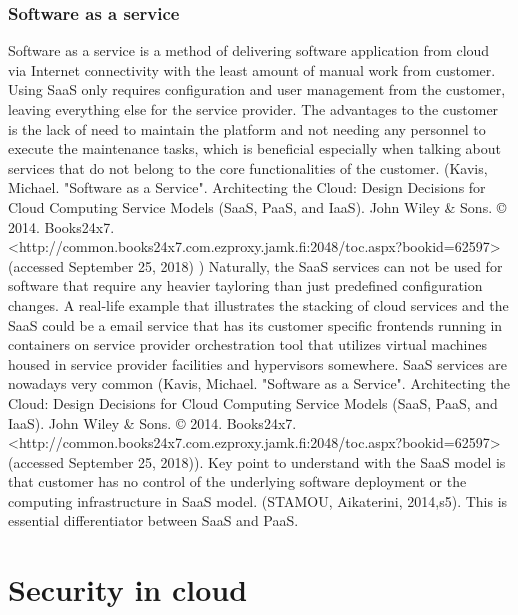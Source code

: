 \documentclass{article}
\begin{document}
\subsubsection{Software as a service}
Software as a service is a method of delivering software application from cloud via Internet connectivity with the least amount of manual work from customer. Using SaaS only requires configuration and user management from the customer, leaving everything else for the service provider. The advantages to the customer is the lack of need to maintain the platform and not needing any personnel to execute the maintenance tasks, which is beneficial especially when talking about services that do not belong to the core functionalities of the customer. (Kavis, Michael. "Software as a Service". Architecting the Cloud: Design Decisions for Cloud Computing Service Models (SaaS, PaaS, and IaaS). John Wiley \& Sons. © 2014. Books24x7. <http://common.books24x7.com.ezproxy.jamk.fi:2048/toc.aspx?bookid=62597> (accessed September 25, 2018) ) Naturally, the SaaS services can not be used for software that require any heavier tayloring than just predefined configuration changes.
A real-life example that illustrates the stacking of cloud services and the SaaS could be a email service that has its customer specific frontends running in containers on service provider orchestration tool that utilizes virtual machines housed in service provider facilities and hypervisors somewhere. SaaS services are nowadays very common (Kavis, Michael. "Software as a Service". Architecting the Cloud: Design Decisions for Cloud Computing Service Models (SaaS, PaaS, and IaaS). John Wiley \& Sons. © 2014. Books24x7. <http://common.books24x7.com.ezproxy.jamk.fi:2048/toc.aspx?bookid=62597> (accessed September 25, 2018)).
Key point to understand with the SaaS model is that customer has no control of the underlying software deployment or the computing infrastructure in SaaS model. (STAMOU, Aikaterini, 2014,s5). This is essential differentiator between SaaS and PaaS.
\section{Security in cloud}
\end{document}
